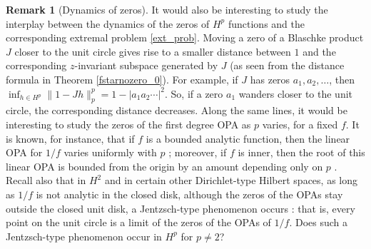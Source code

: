\documentclass{article}
\theoremstyle{plain}
\numberwithin{Theorem}{section}
\numberwithin{equation}{section}
\theoremstyle{plain}
\theoremstyle{definition}
\newtheorem{Remark}[Theorem]{Remark}
\begin{document}
\begin{Remark}[Dynamics of zeros]
It would also be interesting to study the interplay between the dynamics of the zeros of $H^p$ functions and the corresponding extremal problem \eqref{ext_prob}.  Moving a zero of a Blaschke product $J$ closer to the unit circle gives rise to a smaller distance between $1$ and the corresponding $z$-invariant subspace generated by $J$ (as seen from the distance formula in Theorem \ref{fstarnozero_0}).  For example, if  $J$ has zeros $a_1, a_2,\ldots$, then $\inf_{h \in H^p}\|1-Jh\|_p^p = 1 - |a_1 a_2 \cdots |^2$. So, if a zero $a_1$ wanders closer to the unit circle, the corresponding distance decreases. Along the same lines, it would be interesting to study the zeros of the first degree OPA as $p$ varies, for a fixed $f$. It is known, for instance, that if $f$ is a bounded analytic function, then the linear OPA for $1/f$ varies uniformly with $p$ \cite[Lemma 3.1.1]{ChengFelder};  moreover, if $f$ is inner, then the root of this linear OPA is bounded from the origin by an amount depending only on $p$ \cite[Theorem 5.1.3]{CCF}. Recall also that in $H^2$ and in certain other Dirichlet-type Hilbert spaces, as long as $1/f$ is not analytic in the closed disk, although the zeros of the OPAs stay outside the closed unit disk, a 
Jentzsch-type phenomenon occurs \cite{BKLSS}: that is, every point on the unit circle is a limit of the zeros of the OPAs of $1/f$. Does such a Jentzsch-type phenomenon occur in $H^p$ for $p \neq 2$?
\end{Remark}
\end{document}
